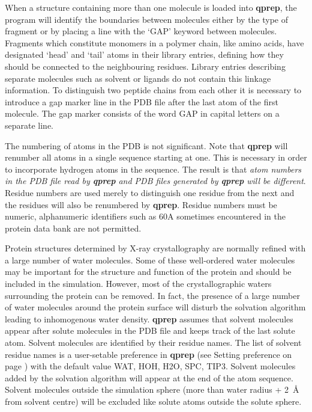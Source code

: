 \documentclass[a4paper,10pt]{article}
\begin{document}
When  a structure  containing more  than one  molecule is  loaded into
\textbf{qprep},  the  program  will identify  the  boundaries  between
molecules either by the type of fragment or by placing a line with the
`GAP' keyword between molecules.   Fragments which constitute monomers
in  a polymer  chain, like  amino  acids, have  designated `head'  and
`tail' atoms  in their  library entries, defining  how they  should be
connected to  the neighbouring  residues.  Library  entries describing
separate  molecules such  as solvent  or ligands  do not  contain this
linkage  information.  To  distinguish  two peptide  chains from  each
other it is necessary  to introduce a gap marker line  in the PDB file
after the last atom of the first molecule.  The gap marker consists of
the word GAP in capital letters on a separate line.

The  numbering of  atoms  in the  PDB is  not  significant. Note  that
\textbf{qprep} will renumber  all atoms in a  single sequence starting
at one.  This is necessary in  order to incorporate hydrogen  atoms in
the sequence. The result is  that \textit{atom numbers in the PDB
  file   read   by  \textbf{qprep}   and   PDB   files  generated   by
  \textbf{qprep} will  be different}. Residue numbers  are used merely
to distinguish one residue from the next and the residues will also be
renumbered  by  \textbf{qprep}.  Residue   numbers  must  be  numeric,
alphanumeric  identifiers such  as  60A sometimes  encountered in  the
protein data bank are not permitted.

Protein structures  determined by  X-ray crystallography  are normally
refined  with  a  large  number  of water  molecules.  Some  of  these
well-ordered water  molecules may be  important for the  structure and
function   of   the   protein   and  should   be   included   in   the
simulation. However,  most of the crystallographic  waters surrounding
the protein can be removed. In fact, the presence of a large number of
water molecules around the protein  surface will disturb the solvation
algorithm  leading  to   inhomogenous  water  density.  \textbf{qprep}
assumes that  solvent molecules appear  after solute molecules  in the
PDB file and  keeps track of the last solute  atom.  Solvent molecules
are identified  by their  residue names. The  list of  solvent residue
names  is a  user-setable  preference in  \textbf{qprep} (see  Setting
preference on page \pageref{setting_pref}) with the default value WAT,
HOH,  H2O,  SPC,  TIP3.  Solvent  molecules  added  by  the  solvation
algorithm  will  appear at  the  end  of  the atom  sequence.  Solvent
molecules  outside the  simulation sphere  (more than  water radius  +
2~{\AA}  from  solvent centre)  will  be  excluded like  solute  atoms
outside the solute sphere.
\end{document}
